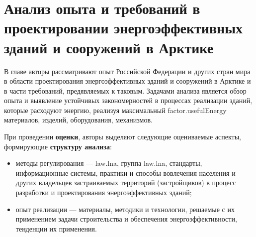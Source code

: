 \chapter{Анализ опыта и требований в проектировании энергоэффективных зданий и сооружений в Арктике}
В главе авторы рассматривают опыт Российской Федерации и других стран мира в области проектирования энергоэффективных зданий и сооружений в Арктике и в части требований, предявляемых к таковым.
Задачами анализа является обзор опыта и выявление устойчивых закономерностей в процессах реализации зданий, которые расходуют энергию, реализуя максимальный \gls{factor.usefulEnergy} материалов, изделий, оборудования, механизмов.

При проведении \textbf{оценки}, авторы выделяют следующие оцениваемые аспекты, формирующие \textbf{структуру анализа}:
\begin{itemize}
    \item методы регулирования --- \gls{law.lna}, группа \gls{law.lna}, стандарты, информационные системы,
    практики и способы вовлечения населения и других владельцев застраиваемых территорий (застройщиков) в процесс разработки и проектирования энергоэффективных зданий;
    \item опыт реализации --- материалы, методики и технологии, решаемые с их применением задачи строительства и обеспечения энергоэффективности, тенденции их применения. %
\end{itemize}


\providecommand{\scAssesmentHeader}[1]
{Оценка опыта и требований в проектировании энергоэффективных зданий #1}
\providecommand{\scAssesmentBuildingClass}{Модельные классы застройки}
\providecommand{\scAssesmentBuildingMetrics}{Модельные метрики потребления энергии}
\providecommand{\scAssesmentExp}{Опыт реализации зданий}
\providecommand{\scAssesmentBuildingLaw}{Методы регулирования}
\providecommand{\scAssesmentSystem}[1]{Система сертификации объектов капитального строительства #1}
\providecommand{\scAssesmentScope}{Юрисдикция и территория действия}










